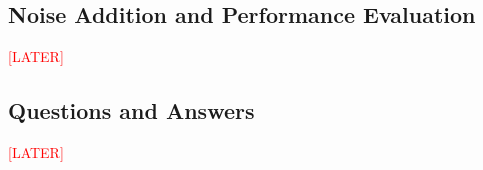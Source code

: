 \subsection{Noise Addition and Performance Evaluation}
\textcolor{red}{[LATER]}
\subsection{Questions and Answers}
\textcolor{red}{[LATER]}